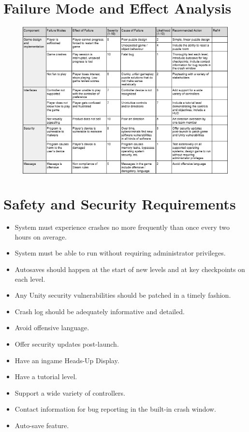 \documentclass{article}
\begin{document}
\section{Failure Mode and Effect Analysis}

\begin{figure}[h!]
	\includegraphics[width=\linewidth]{FMEA.png}
\end{figure}

\section{Safety and Security Requirements}

\begin{itemize}
\item{System must experience crashes no more frequently than once every two hours on average.}
\item{System must be able to run without requiring administrator privileges.}
\item{Autosaves should happen at the start of new levels and at key checkpoints on each level.}
\item{Any Unity security vulnerabilities should be patched in a timely fashion.}
\item{Crash log should be adequately informative and detailed.}
\item{Avoid offensive language.}
\item{Offer security updates post-launch.}
\item{Have an ingame Heads-Up Display.}
\item{Have a tutorial level.}
\item{Support a wide variety of controllers.}
\item{Contact information for bug reporting in the built-in crash window.}
\item{Auto-save feature.}
\end{itemize}
\end{document}
